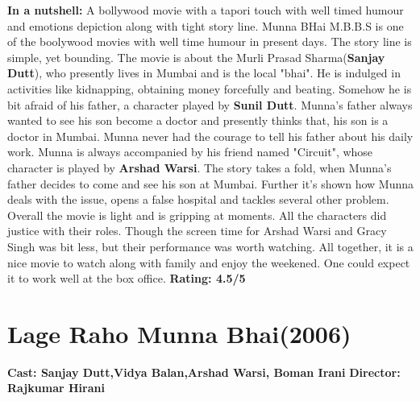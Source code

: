 \documentclass{article}
\begin{document}
\newline
\newline
\textbf{In a nutshell: } A bollywood movie with a tapori touch with well timed humour and emotions depiction along with tight story line.
\newline
Munna BHai M.B.B.S\cite{MunnaBhai} is one of the boolywood movies with well time humour in present days. The story line is simple, yet bounding. The movie is about the Murli Prasad Sharma(\textbf{Sanjay Dutt}), who presently lives in Mumbai and is the local "bhai". He is indulged in activities like kidnapping, obtaining money forcefully and beating. Somehow he is bit afraid of his father, a character played by \textbf{Sunil Dutt}. Munna's father always wanted to see his son become a doctor and presently thinks that, his son is a doctor in Mumbai. Munna never had the courage to tell his father about his daily work. Munna is always accompanied by his friend named "Circuit", whose character is played by \textbf{Arshad Warsi}. The story takes a fold, when Munna's father decides to come and see his son at Mumbai. Further it's shown how Munna deals with the issue, opens a false hospital and tackles several other problem. \newline
Overall the movie is light and is gripping at moments. All the characters did justice with their roles. Though the screen time for Arshad Warsi and Gracy Singh was bit less, but their performance was worth watching. All together, it is a nice movie to watch along with family and enjoy the weekened. One could expect it to work well at the box office.
\newline
\textbf{Rating: 4.5/5}


\section{Lage Raho Munna Bhai(2006)}

\textbf{Cast: Sanjay Dutt,Vidya Balan,Arshad Warsi, Boman Irani}
\textbf{Director: Rajkumar Hirani }  
\end{document}
